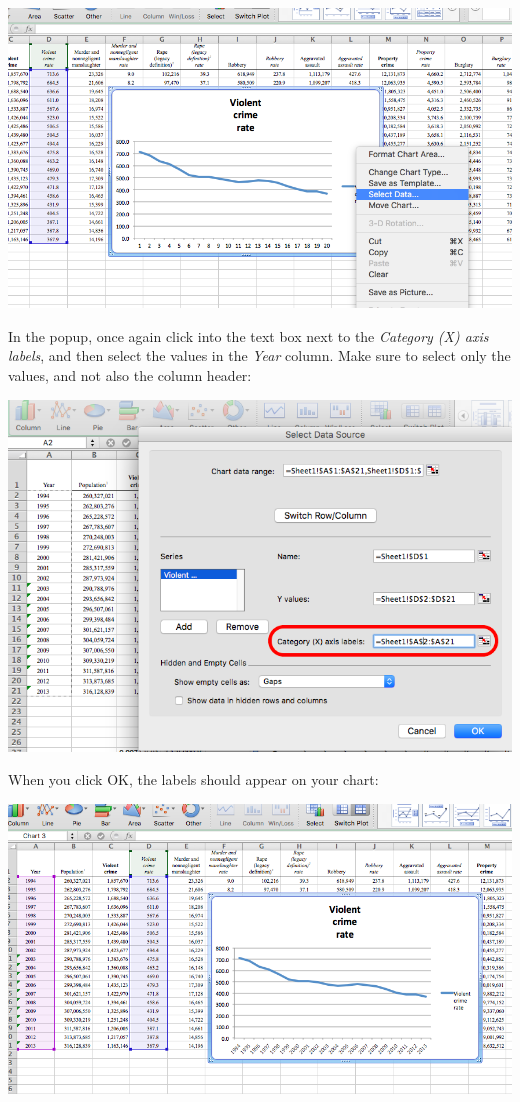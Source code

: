 \documentclass[
]{book}
\begin{document}
\includegraphics{imgs/desc_line_2.png}

In the popup, once again click into the text box next to the \emph{Category (X) axis labels}, and then select the values in the \emph{Year} column. Make sure to select only the values, and not also the column header:

\includegraphics{imgs/desc_viz_4.png}

When you click OK, the labels should appear on your chart:

\includegraphics{imgs/desc_line_3.png}
\end{document}
